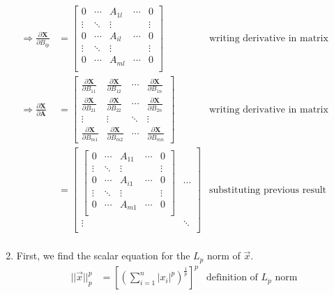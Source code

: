 \documentclass[11pt]{article}
\newcommand{\pd}[2]{\frac{\partial #1}{\partial #2}}
\begin{document}
\begin{enumerate}
\begin{align*}
        \Rightarrow \pd{\textbf{X}}{B_{lp}} &= \begin{bmatrix}
            0 & \cdots & A_{1l} & \cdots & 0 \\
            \vdots & \ddots & \vdots & & \vdots \\
            0 & \cdots & A_{il} & \cdots & 0 \\
            \vdots & \ddots & \vdots & & \vdots \\
            0 & \cdots & A_{ml} & \cdots & 0 \\
        \end{bmatrix} & \text{writing derivative in matrix form} \\
        \Rightarrow \pd{\textbf{X}}{\textbf{A}} &= \begin{bmatrix}
            \pd{\textbf{X}}{B_{11}} & \pd{\textbf{X}}{B_{12}} & \cdots & \pd{\textbf{X}}{B_{1n}} \\
            \pd{\textbf{X}}{B_{21}} & \pd{\textbf{X}}{B_{22}} & \cdots & \pd{\textbf{X}}{B_{2n}} \\
            \vdots & \vdots & \ddots & \vdots \\
            \pd{\textbf{X}}{B_{m1}} & \pd{\textbf{X}}{B_{m2}} & \cdots & \pd{\textbf{X}}{B_{mn}}
        \end{bmatrix} & \text{writing derivative in matrix form} \\
        &= \begin{bmatrix}
            \begin{bmatrix}
                0 & \cdots & A_{11} & \cdots & 0 \\
                \vdots & \ddots & \vdots & & \vdots \\
                0 & \cdots & A_{i1} & \cdots & 0 \\
                \vdots & \ddots & \vdots & & \vdots \\
                0 & \cdots & A_{m1} & \cdots & 0 \\
            \end{bmatrix} & \cdots \\
            \vdots & \ddots \\
        \end{bmatrix} & \text{substituting previous result} \\
    \end{align*}
    \item First, we find the scalar equation for the $L_p$ norm of $\vec{x}$.
    \begin{align*}
        ||\vec{x}||_p^p &= \left[ \left(\sum_{i=1}^{n} |x_i|^p \right)^{\frac{1}{p}} \right]^p & \text{definition of } L_p \text{ norm} \\

\end{align*}
\end{enumerate}
\end{document}
